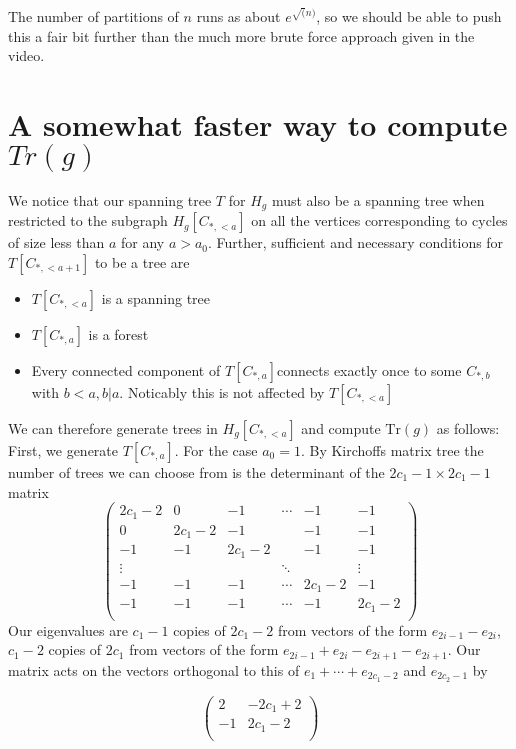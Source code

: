 \documentclass[10pt]{article}
\newcommand{\Tr}{\text{Tr}}
\begin{document}
The number of partitions of $n$ runs as about $e^{\sqrt(n)}$, so we should be able to push this a fair bit further than the much more brute force approach given in the video.

\section{A somewhat faster way to compute $Tr(g)$}

We notice that our spanning tree $T$ for $H_g$ must also be a spanning tree when restricted to the subgraph $H_g[C_{*,<a}]$ on all the vertices corresponding to cycles of size less than $a$ for any $a > a_0$. Further, sufficient and necessary conditions for $T[C_{*,<a+1}]$ to be a tree are
\begin{itemize}
\item $T[C_{*,<a}]$ is a spanning tree
\item $T[C_{*,a}]$ is a forest
\item Every connected component of  $T[C_{*,a}]$connects exactly once to some $C_{*,b}$ with $b<a, b|a$. Noticably this is not affected by $T[C_{*,<a}]$
\end{itemize}

We can therefore generate trees in  $H_g[C_{*,<a}]$ and compute $\Tr(g)$ as follows:
First, we generate $T[C_{*,a}]$.
For the case $a_0=1$. By Kirchoffs matrix tree the number of trees we can choose from is the determinant of the $2c_1-1 \times 2c_1-1$ matrix
\[\left(\begin{array}{cccccc}
2c_1-2&0&-1&\cdots&-1&-1\\
0&2c_1-2&-1&&-1&-1\\
-1&-1&2c_1-2&&-1&-1\\
\vdots&&&\ddots&&\vdots\\
-1&-1&-1&\cdots&2c_1-2&-1\\
-1&-1&-1&\cdots&-1&2c_1-2\\
\end{array}\right)\]
Our eigenvalues are $c_1-1$ copies of $2c_1-2$ from vectors of the form $e_{2i-1}-e_{2i}$, $c_1-2$ copies of $2c_1$ from vectors of the form $e_{2i-1}+e_{2i}-e_{2i+1}-e_{2i+1}$. Our matrix acts on the vectors orthogonal to this of $e_1+\cdots + e_{2c_1-2}$ and $e_{2c_2-1}$ by

\[\left(\begin{array}{cc}
2&-2c_1+2\\
-1&2c_1-2\\
\end{array}\right)\]
\end{document}
